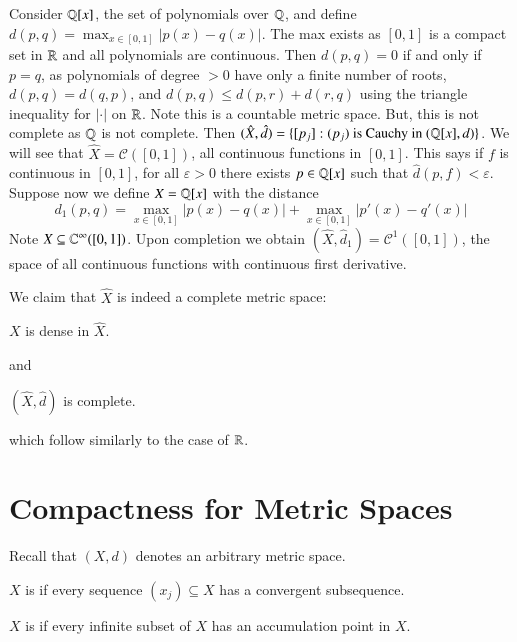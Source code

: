 \begin{eg}
    Consider $\mathbb Q[x]$, the set of polynomials over $\mathbb Q$, and define $d(p,q) = \max_{x \in [0,1]}|p(x) - q(x)|$. The max exists as $[0,1]$ is a compact set in $\mathbb R$ and all polynomials are continuous. Then $d(p,q) = 0$ if and only if $p = q$, as polynomials of degree $> 0$ have only a finite number of roots, $d(p,q) = d(q,p)$, and $d(p,q) \leq d(p,r) + d(r,q)$ using the triangle inequality for $|\cdot|$ on $\mathbb R$. Note this is a countable metric space. But, this is not complete as $\mathbb Q$ is not complete. Then $(\hat{X},\hat{d}) = \{[p_j]:(p_j)\text{ is Cauchy in }(\mathbb Q[x],d)\}$. We will see that $\hat{X} = \mathcal{C}([0,1])$, all continuous functions in $[0,1]$. This says if $f$ is continuous in $[0,1]$, for all $\varepsilon > 0$ there exists $p \in \mathbb Q[x]$ such that $\hat{d}(p,f) < \varepsilon$. Suppose now we define $X = \mathbb Q[x]$ with the distance \begin{equation*}
        d_1(p,q) = \max_{x \in [0,1]}|p(x) - q(x)| + \max_{x \in [0,1]}|p'(x) - q'(x)|
    \end{equation*}
    Note $X \subseteq \mathbb C^{\infty}([0,1])$. Upon completion we obtain $(\hat{X},\hat{d}_1) = \mathcal{C}^1([0,1])$, the space of all continuous functions with continuous first derivative.
\end{eg}

We claim that $\hat{X}$ is indeed a complete metric space:

\begin{lem}
    $X$ is dense in $\hat{X}$.
\end{lem}
and 
\begin{prop}
    $(\hat{X},\hat{d})$ is complete.
\end{prop}
which follow similarly to the case of $\mathbb R$.



\section{Compactness for Metric Spaces}

Recall that $(X,d)$ denotes an arbitrary metric space.

\begin{defn}
    $X$ is  if every sequence $(x_j) \subseteq X$ has a convergent subsequence.
\end{defn}

\begin{defn}
    $X$ is  if every infinite subset of $X$ has an accumulation point in $X$.
\end{defn}


